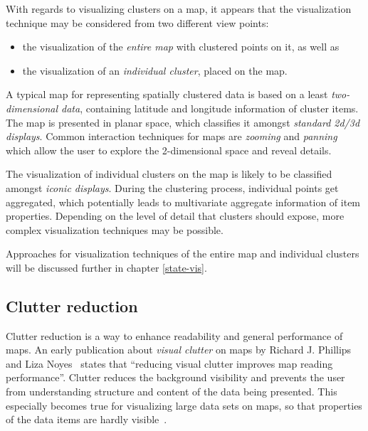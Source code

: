 With regards to visualizing clusters on a map, it appears that the visualization technique may be considered from two different view points:

\begin{itemize}

\item the visualization of the \textit{entire map} with clustered points on it, as well as

\item the visualization of an \textit{individual cluster}, placed on the map.

\end{itemize}

A typical map for representing spatially clustered data is based on a least \textit{two-dimensional data}, containing latitude and longitude information of cluster items. The map is presented in planar space, which classifies it amongst \textit{standard 2d/3d displays}. Common interaction techniques for maps are \textit{zooming} and \textit{panning} which allow the user to explore the 2-dimensional space and reveal details.

The visualization of individual clusters on the map is likely to be classified amongst \textit{iconic displays}. During the clustering process, individual points get aggregated, which potentially leads to multivariate aggregate information of item properties. Depending on the level of detail that clusters should expose, more complex visualization techniques may be possible. 

Approaches for visualization techniques of the entire map and individual clusters will be discussed further in chapter  \ref{state-vis}.

\subsection{Clutter reduction}
\label{clutter-reduction}

Clutter reduction is a way to enhance readability and general performance of maps. An early publication about \textit{visual clutter} on maps by Richard J. Phillips and Liza Noyes~\cite{phillips82clutter} states that ``reducing visual clutter improves map reading performance''. Clutter reduces the background visibility and prevents the user from understanding structure and content of the data being presented. This especially becomes true for visualizing large data sets on maps, so that properties of the data items are hardly visible~\cite{harvey2008primer, Delort10vis}.

